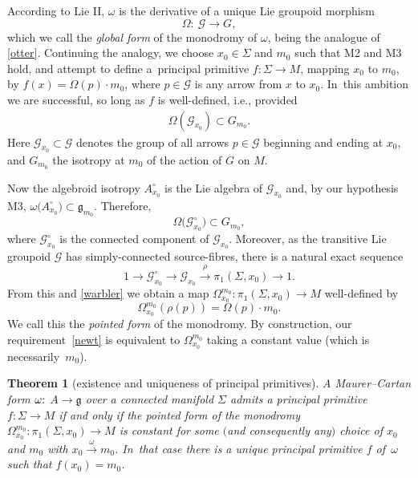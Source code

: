 \documentclass[10pt,a4paper]{amsart}
\numberwithin{equation}{section}
\newtheorem{Theorem}{Theorem}[section]
\begin{document}
According to Lie II, $\omega $ is the derivative of a unique Lie
groupoid morphism
\begin{equation}\label{global}
 \Omega \colon\ {\mathcal G} \rightarrow G,
\end{equation}
which we call the {\it global form} of the monodromy of $\omega $,
being the analogue of \eqref{otter}. Continuing the analogy, we
choose $x_0 \in \Sigma $ and $m_0$ such that M2 and M3 hold, and
attempt to define a~principal primitive
$f \colon \Sigma \rightarrow M$, mapping $x_0$ to $m_0$, by
$f(x)=\Omega(p)\cdot m_0 $, where $p \in {\mathcal G} $ is any arrow
from $x$ to $x_0$. In~this ambition we are successful, so long as $f$
is well-defined, i.e., provided
\begin{gather}
\Omega({\mathcal G}_{x_0}) \subset G_{m_0}.\label{newt}
\end{gather}
Here ${\mathcal G}_{x_0} \subset {\mathcal G}$ denotes
the group of all arrows $p \in {\mathcal G} $ beginning and ending at
$x_0$, and $G_{m_0}$ the isotropy at $m_0 $ of the action of $G$ on
$M$.

Now the algebroid isotropy $A^\circ_{x_0}$ is the Lie algebra of
${\mathcal G}_{x_0} $ and, by our hypothesis M3,
$\omega\big(A^\circ_{x_0}\big) \allowbreak\subset {\mathfrak g}_{m_0}$. Therefore,
\begin{equation} \Omega\big({\mathcal G}_{x_0}^\circ\big) \subset G_{m_0},
\label{warbler}
\end{equation}
where ${\mathcal G}_{x_0}^\circ$ is the connected
component of ${\mathcal G}_{x_0}$. Moreover, as the transitive Lie
groupoid ${\mathcal G} $ has simply-connected source-fibres, there is
a natural exact sequence
\begin{equation*}
1 \rightarrow {\mathcal G}_{x_0}^\circ \rightarrow
{\mathcal G}_{x_0}\xrightarrow{\rho} \pi_1(\Sigma, x_0) \rightarrow 1.
\end{equation*} From this and \eqref{warbler} we obtain a map
$\Omega_{x_0}^{m_0} \colon \pi_1(\Sigma ,x_0) \rightarrow M$
well-defined by
\begin{equation*} \Omega_{x_0}^{m_0}(\rho ( p))=\Omega(p) \cdot m_0.
\end{equation*}
We call this the {\it pointed form} of the
monodromy. By construction, our requirement~\eqref{newt} is equivalent
to $\Omega_{x_0}^{m_0}$ taking a constant value (which is necessarily~$m_0$).

\begin{Theorem}[existence and uniqueness of principal primitives]\label{outlineT}
 A Maurer--Cartan form $\omega{\rm :}$ $A \rightarrow {\mathfrak g} $
 over a connected manifold $\Sigma $ admits a principal primitive
 $f \colon \Sigma \rightarrow M$ if and only if the pointed form of
 the monodromy
 $\Omega_{x_0}^{m_0} \colon \pi_1(\Sigma, x_0) \rightarrow M$ is
 constant for some $($and consequently any$)$ choice of $x_0$ and $m_0$
 with $x_0\xrightarrow{\omega}m_0$. In~that case there is a unique
 principal primitive $f$ of~$\omega $ such that $f(x_0)=m_0$.
\end{Theorem}
\end{document}
